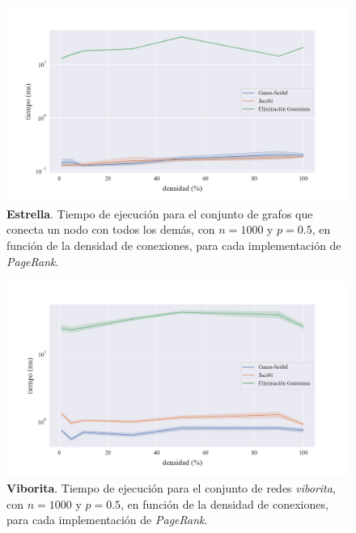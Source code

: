 \begin{figure}[!htbp]
    \centering
    \includegraphics[width=.9\textwidth]{files/src/.media/densidad_uno_a_todos.png}
    \caption{\textbf{Estrella}. Tiempo de ejecución para el conjunto de grafos que conecta un nodo con todos los demás, con $n = 1000$ y $p = 0.5$, en función de la densidad de conexiones, para cada implementación de \textit{PageRank}.}
    \label{densidad_uno_a_todos}
\end{figure}

\begin{figure}[!htbp]
    \centering
    \includegraphics[width=.9\textwidth]{files/src/.media/densidad_viborita.png}
    \caption{\textbf{Viborita}. Tiempo de ejecución para el conjunto de redes \textit{viborita}, con $n = 1000$ y $p = 0.5$, en función de la densidad de conexiones, para cada implementación de \textit{PageRank}.}
    \label{densidad_viborita}
\end{figure}
